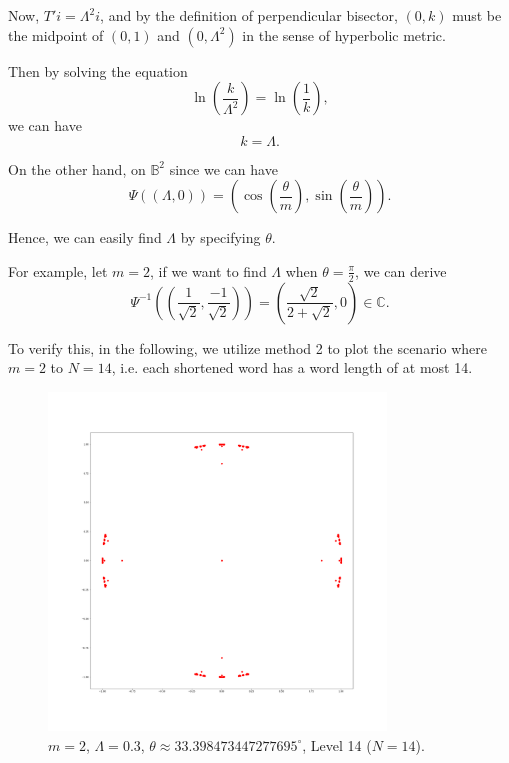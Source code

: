 \documentclass[12pt,oneside]{sfsuthesis}
\theoremstyle{plain} %
\theoremstyle{definition}  %
\theoremstyle{remark}  %
\theoremstyle{plain}
\begin{document}
{Now, $T'i=\Lambda^2 i$, and by the definition of perpendicular bisector, $(0,k)$ must be the midpoint of $(0,1)$ and $(0,\Lambda^2)$ in the sense of hyperbolic metric.

Then by solving the equation
$$
\ln\left(\frac{k}{\Lambda^2} \right)=\ln\left(\frac{1}{k}\right),
$$
we can have
$$
k=\Lambda.
$$

On the other hand, on $\mathbb{B}^2$ since we can have 
$$
\Psi((\Lambda,0)) = \left(\cos\left(\frac{\theta}{m}\right), \sin\left(\frac{\theta}{m}\right)\right).
$$

Hence, we can easily find $\Lambda$ by specifying $\theta$.

For example, let $m=2$, if we want to find $\Lambda$ when $\theta=\frac{\pi}{2}$, we can derive
$$
\Psi^{-1}\left(\left(\frac{1}{\sqrt{2}}, \frac{-1}{\sqrt{2}}\right)\right)
=\left(\frac{\sqrt{2}}{2+\sqrt{2}},0\right)\in\mathbb{C}.
$$


To verify this, in the following, we utilize method 2 to plot the scenario where $m=2$ to $N=14$, i.e. each shortened word has a word length of at most 14.


\begin{figure}[H]
\centering
\includegraphics[width=0.8\textwidth]{Lambda=0.3,m=2,N=14.png}
\caption{$m=2$, $\Lambda=0.3$, $\theta\approx 33.398473447277695^{\circ}$, Level 14 ($N=14$).}
\end{figure}

}
\end{document}
